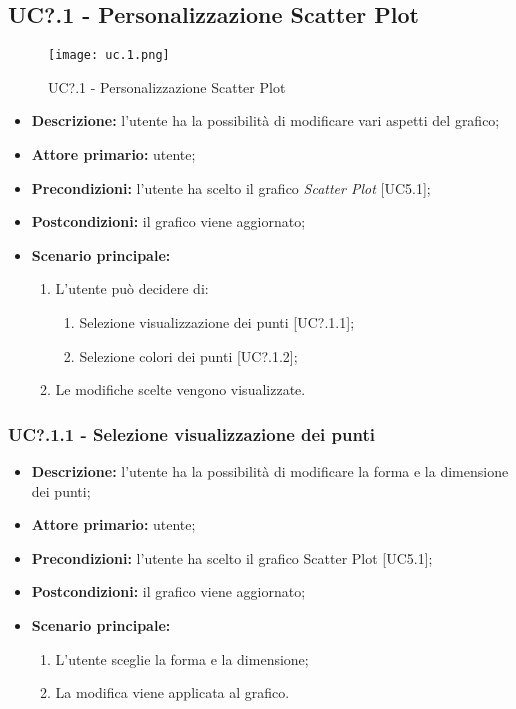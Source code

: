 \subsection{UC?.1 - Personalizzazione Scatter Plot}
\begin{figure}[H]
  \centering
  \texttt{[image: uc.1.png]}
  \caption{UC?.1 - Personalizzazione Scatter Plot}
\end{figure}
\begin{itemize}
    \item \textbf{Descrizione:} l'utente ha la possibilità di modificare vari aspetti del grafico;
    \item \textbf{Attore primario:} utente;
    \item \textbf{Precondizioni:} l’utente ha scelto il grafico \textit{Scatter Plot} [UC5.1];
    \item \textbf{Postcondizioni:} il grafico viene aggiornato;
    \item \textbf{Scenario principale:}
    \begin{enumerate}
      \item L'utente può decidere di:
    \begin{enumerate}
      \item Selezione visualizzazione dei punti [UC?.1.1];
      \item Selezione colori dei punti  [UC?.1.2];
    \end{enumerate}
    \item Le modifiche scelte vengono visualizzate.
  \end{enumerate}
  \end{itemize}

  \subsubsection{UC?.1.1 - Selezione visualizzazione dei punti}
  \begin{itemize}
    \item \textbf{Descrizione:} l'utente ha la possibilità di modificare la forma e la dimensione dei punti;
    \item \textbf{Attore primario:} utente;
    \item \textbf{Precondizioni:} l’utente ha scelto il grafico Scatter Plot [UC5.1];
    \item \textbf{Postcondizioni:} il grafico viene aggiornato;
    \item \textbf{Scenario principale:}
     \begin{enumerate}
      \item L'utente sceglie la forma e la dimensione;
      \item La modifica viene applicata al grafico.
    \end{enumerate}
  \end{itemize}

